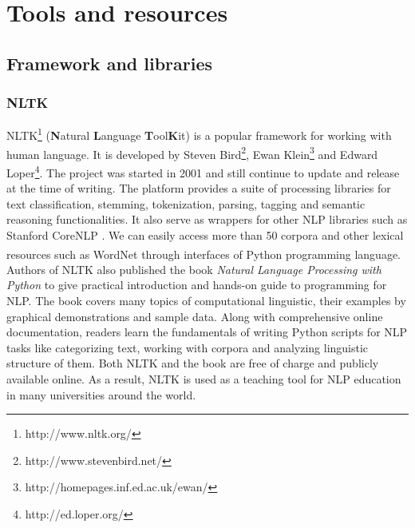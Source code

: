 
\chapter{Tools and resources}
	\label{chapter:empire-strikes-back}%



\section{Framework and libraries}
\subsection*{NLTK}
NLTK\footnote{http://www.nltk.org/} (\textbf{N}atural \textbf{L}anguage \textbf{T}ool\textbf{K}it) is a popular framework for working with human language. It is developed by Steven Bird\footnote{http://www.stevenbird.net/}, Ewan Klein\footnote{http://homepages.inf.ed.ac.uk/ewan/} and Edward Loper\footnote{http://ed.loper.org/}. The project was started in 2001 and still continue to update and release at the time of writing. The platform provides a suite of processing libraries for text classification, stemming, tokenization, parsing, tagging and semantic reasoning functionalities. It also serve as wrappers for other NLP libraries such as Stanford CoreNLP \cite{manning-EtAl:2014:P14-5}. We can easily access more than 50 corpora and other lexical resources such as WordNet\textsuperscript{\textregistered} through interfaces of Python programming language.\\
Authors of NLTK also published the book \textit{Natural Language Processing with Python} \cite{Bird2009} to give practical introduction and hands-on guide to programming for NLP. The book covers many topics of computational linguistic, their examples by graphical demonstrations and sample data. Along with comprehensive online documentation, readers learn the fundamentals of writing Python scripts for NLP tasks like categorizing text, working with corpora and analyzing linguistic structure of them. Both NLTK and the book are free of charge and publicly available online. As a result, NLTK is used as a teaching tool for NLP education in many universities around the world.\\

